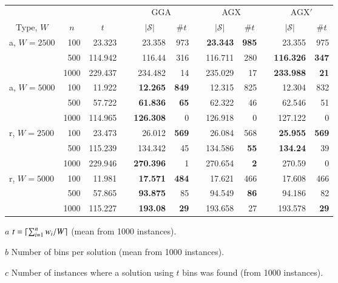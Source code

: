 \documentclass[authoryear]{elsarticle}
\begin{document}
\begin{table}[h!]
\centering
\caption{}
\begin{threeparttable}
\begin{tabular}{lrrcrrcrrcrr}
	\toprule
	& & & & \multicolumn{2}{c}{GGA} &\phantom{ab}& \multicolumn{2}{c}{AGX} &\phantom{a'}& \multicolumn{2}{c}{AGX$'$}\\
	\cmidrule{5-6} \cmidrule{8-9} \cmidrule{11-12}
	\multicolumn{1}{c}{Type, $W$} & \multicolumn{1}{c}{$n$} & \multicolumn{1}{c}{$t$\tnote{$a$}} && \multicolumn{1}{c}{$|\mathcal{S}|$\tnote{$b$}} & \multicolumn{1}{c}{$\# t$\tnote{$c$}} && \multicolumn{1}{c}{$|\mathcal{S}|$} & \multicolumn{1}{c}{$\# t$} && \multicolumn{1}{c}{$|\mathcal{S}|$} & \multicolumn{1}{c}{$\# t$}\\
	\midrule
	a, $W=2500$ & 100 & 23.323 && 23.358 & 973 && \textbf{23.343} & \textbf{985} && 23.355 & 975 \\
	& 500 & 114.942 && 116.44 & 316 && 116.711 & 280 && \textbf{116.326} &\textbf{347} \\
	& 1000 & 229.437 && 234.482 & 14 && 235.029 & 17 && \textbf{233.988} &\textbf{21} \\
	\midrule
	a, $W=5000$ & 100 & 11.922 && \textbf{12.265} & \textbf{849} && 12.315 & 825 && 12.304 & 832 \\
	& 500 & 57.722 && \textbf{61.836} & \textbf{65} && 62.322 & 46 && 62.546 & 51 \\
	& 1000 & 114.965 && \textbf{126.308} & 0 && 126.918 & 0 && 127.122 & 0 \\
	\midrule
	\midrule
	r, $W=2500$ & 100 & 23.473 && 26.012 & \textbf{569} && 26.084 & 568 && \textbf{25.955} &\textbf{569} \\
	& 500 & 115.239 && 134.342 & 45 && 134.586 & \textbf{55} && \textbf{134.24} & 39 \\
	& 1000 & 229.946 && \textbf{270.396} & 1 && 270.654 & \textbf{2} && 270.59 & 0 \\
	\midrule
	r, $W=5000$ & 100 & 11.981 && \textbf{17.571} & \textbf{484} && 17.621 & 466 && 17.608 & 466 \\
	& 500 & 57.865 && \textbf{93.875} & 85 && 94.549 & \textbf{86} && 94.186 & 82 \\
	& 1000 & 115.227 && \textbf{193.08} & \textbf{29} && 193.658 & 27 && 193.578 &\textbf{29} \\
	\bottomrule
\end{tabular}	
\vspace{0.2cm} %
\begin{tablenotes}
	\item[$a$] $t = \lceil\sum_{i=1}^{n} w_i / W\rceil$ (mean from 1000 instances).
	\item[$b$] Number of bins per solution (mean from 1000 instances).
	\item[$c$] Number of instances where a solution using $t$ bins was found (from 1000 instances).
\end{tablenotes}
\end{threeparttable}
\label{table:ea}
\end{table}
\end{document}
